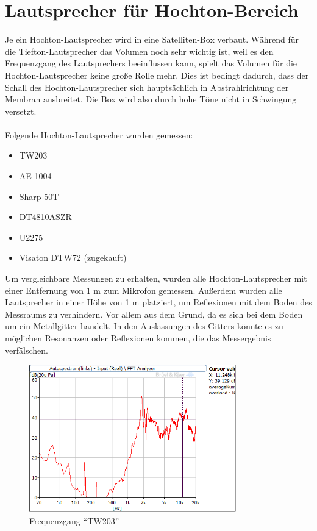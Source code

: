 
\newpage
\section{Lautsprecher für Hochton-Bereich}\label{sec:4.3}
Je ein Hochton-Lautsprecher wird in eine Satelliten-Box verbaut.
Während für die Tiefton-Lautsprecher das Volumen noch sehr wichtig ist, weil es den Frequenzgang des Lautsprechers beeinflussen kann, spielt das Volumen für die Hochton-Lautsprecher keine große Rolle mehr.
Dies ist bedingt dadurch, dass der Schall des Hochton-Lautsprecher sich hauptsächlich in Abstrahlrichtung der Membran ausbreitet.
Die Box wird also durch hohe Töne nicht in Schwingung versetzt.
\\ \\
Folgende Hochton-Lautsprecher wurden gemessen:
\begin{itemize}
	\item TW203
	\item AE-1004
	\item Sharp 50T
	\item DT4810ASZR
	\item U2275
	\item Visaton DTW72 (zugekauft)
\end{itemize}
Um vergleichbare Messungen zu erhalten, wurden alle Hochton-Lautsprecher mit einer Entfernung von 1 m zum Mikrofon gemessen.
Außerdem wurden alle Lautsprecher in einer Höhe von 1 m platziert, um Reflexionen mit dem Boden des Messraums zu verhindern.
Vor allem aus dem Grund, da es sich bei dem Boden um ein Metallgitter handelt.
In den Auslassungen des Gitters könnte es zu möglichen Resonanzen oder Reflexionen kommen, die das Messergebnis verfälschen.
\newpage

\begin{figure} [H]
	\centering
	\includegraphics[width=0.8\textwidth]{img/LSMessung/HT/TW203_1m_erhoeht.png}
	\caption{Frequenzgang \enquote{TW203}}
	\label{fig:4.3.1}
\end{figure}

